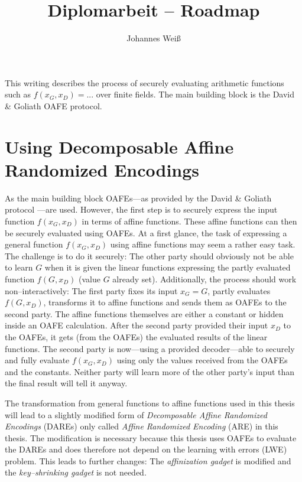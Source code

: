 \documentclass[12pt, a4paper]{article}
\title{Diplomarbeit -- Roadmap}
\author{Johannes Weiß}
\begin{document}
\maketitle

This writing describes the process of securely evaluating arithmetic functions
such as $f(x_G,x_D) = ...$ over finite fields. The main building block is the
David \& Goliath OAFE protocol\cite{davidgoliath}.

\section{Using Decomposable Affine Randomized Encodings}
\label{sec:using-dare}

As the main building block OAFEs---as provided by the David \& Goliath protocol
\cite{davidgoliath}---are used. However, the first step is to securely express
the input function $f(x_G, x_D)$ in terms of affine functions. These affine
functions can then be securely evaluated using OAFEs. At a first glance, the
task of expressing a general function $f(x_G, x_D)$ using affine functions may
seem a rather easy task. The challenge is to do it securely: The other party
should obviously not be able to learn $G$ when it is given the linear functions
expressing the partly evaluated function $f(G, x_D)$ (value $G$ already set).
Additionally, the process should work non--interactively: The first party fixes
its input $x_G = G$, partly evaluates $f(G, x_D)$, transforms it to affine
functions and sends them as OAFEs to the second party. The affine functions
themselves are either a constant or hidden inside an OAFE calculation. After the
second party provided their input $x_D$ to the OAFEs, it gets (from the OAFEs)
the evaluated results of the linear functions. The second party is now---using a
provided decoder---able to securely and fully evaluate $f(x_G, x_D)$ using only
the values received from the OAFEs and the constants. Neither party will learn
more of the other party's input than the final result will tell it anyway.

The transformation from general functions to affine functions used in this
thesis will lead to a slightly modified form of \emph{Decomposable Affine
Randomized Encodings} (DAREs) \cite{gac2012} only called \emph{Affine Randomized
Encoding} (ARE) in this thesis. The modification is necessary because this
thesis uses OAFEs to evaluate the DAREs and does therefore not depend on the
learning with errors (LWE) problem. This leads to further changes: The
\emph{affinization gadget} \cite{gac2012} is modified and the
\emph{key--shrinking gadget} \cite{gac2012} is not needed.
\end{document}
